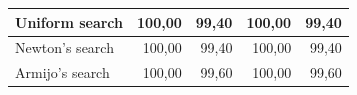\documentclass[a4paper,english,titlepage,12pt]{article}
\begin{document}
\begin{table}[H]
\begin{tabular}{|l|r|r|r|r|}
    Uniform search                                                             & 100,00                                                   & \cellcolor[HTML]{F7D9D7}99,40                             & 100,00                                                    & \cellcolor[HTML]{F7D9D7}99,40                             \\ \hline
    Newton's search                                                             & 100,00                                                   & \cellcolor[HTML]{F7D9D7}99,40                             & 100,00                                                    & \cellcolor[HTML]{F7D9D7}99,40                             \\ \hline
    Armijo's search                                                              & 100,00                                                   & 99,60                                                     & 100,00                                                    & 99,60                                                     \\ \hline
    \end{tabular}
\end{table}
\end{document}
